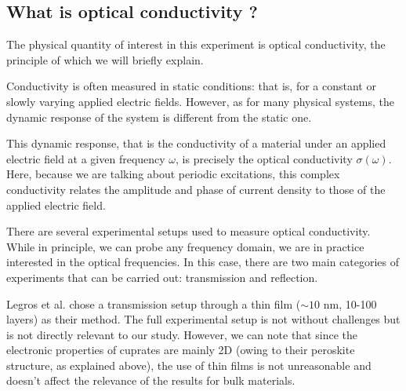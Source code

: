 \subsection{What is optical conductivity ?}
The physical quantity of interest in this experiment is optical conductivity, 
the principle of which we will briefly explain.

Conductivity is often measured in static conditions: 
that is, for a constant or slowly varying applied electric fields. 
However, as for many physical systems, 
the dynamic response of the system is different from the static one. 

This dynamic response, 
that is the conductivity of a material under an applied electric field at a given frequency $\omega$, 
is precisely the optical conductivity $\sigma(\omega)$. 
Here, because we are talking about periodic excitations, this complex conductivity relates the amplitude and phase of current density to those of the applied electric field.


There are several experimental setups used to measure optical conductivity. 
While in principle, we can probe any frequency domain, 
we are in practice interested in the optical frequencies. 
In this case, there are two main categories of experiments that can be carried out: 
transmission and reflection. 


Legros et al.\cite{legros2022} chose a transmission setup through a thin film ($\sim 10$ nm, 10-100 layers) as their method. 
The full experimental setup is not without challenges but is not directly relevant to our study. 
However, we can note that since the electronic properties of cuprates are mainly 2D 
(owing to their peroskite structure, as explained above), 
the use of thin films is not unreasonable 
and doesn't affect the relevance of the results for bulk materials.